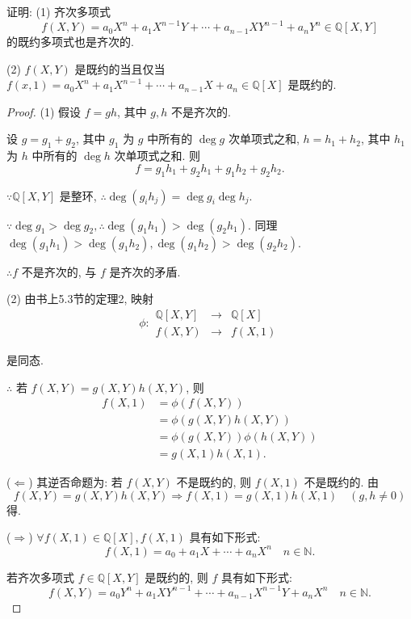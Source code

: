 \documentclass[UTF8]{ctexart}
\begin{document}
\begin{exercise}[3.5]
    证明: (1) 齐次多项式
    \[f(X,Y)=a_0X^n+a_1X^{n-1}Y+\cdots+a_{n-1}XY^{n-1}+a_nY^n\in\mathbb{Q}[X,Y]\]
    的既约多项式也是齐次的.
    
    (2) $f(X,Y)$ 是既约的当且仅当 $f(x,1)=a_0X^n+a_1X^{n-1}+\cdots+a_{n-1}X+a_n\in\mathbb{Q}[X]$ 是既约的.
\end{exercise}
\begin{proof}
    (1) 假设 $f=gh$, 其中 $g,h$ 不是齐次的.

    设 $g=g_1+g_2$, 其中 $g_1$ 为 $g$ 中所有的 $\deg g$ 次单项式之和, $h=h_1+h_2$, 其中 $h_1$ 为 $h$ 中所有的 $\deg h$ 次单项式之和. 则
    \[f=g_1h_1+g_2h_1+g_1h_2+g_2h_2.\]

    $\because\mathbb{Q}[X,Y]$ 是整环, $\therefore\deg(g_ih_j)=\deg g_i\deg h_j$.
    
    $\because\deg g_1>\deg g_2,\therefore\deg(g_1h_1)>\deg(g_2h_1)$. 同理 $\deg(g_1h_1)>\deg(g_1h_2),\deg(g_1h_2)>\deg(g_2h_2)$.

    $\therefore f$ 不是齐次的, 与 $f$ 是齐次的矛盾.

    (2) 由书上5.3节的定理2, 映射
    \[\phi:\begin{array}{rcl}
        \mathbb{Q}[X,Y] & \to & \mathbb{Q}[X] \\
        f(X,Y) & \to & f(X,1)
    \end{array}\]

    是同态.

    $\therefore$ 若 $f(X,Y)=g(X,Y)h(X,Y)$, 则
    \begin{align*}
        f(X,1) & =\phi(f(X,Y)) \\
        & =\phi(g(X,Y)h(X,Y)) \\
        & =\phi(g(X,Y))\phi(h(X,Y)) \\
        & =g(X,1)h(X,1).
    \end{align*}

    ($\Leftarrow$) 其逆否命题为: 若 $f(X,Y)$ 不是既约的, 则 $f(X,1)$ 不是既约的. 由
    \[f(X,Y)=g(X,Y)h(X,Y)\Rightarrow f(X,1)=g(X,1)h(X,1)\quad(g,h\neq0)\]
    得.
    
    ($\Rightarrow$) $\forall f(X,1)\in\mathbb{Q}[X],f(X,1)$ 具有如下形式:
    \begin{equation}\label{eq4.4}
        f(X,1)=a_0+a_1X+\cdots+a_nX^n\quad n\in\mathbb{N}.
    \end{equation}

    若齐次多项式 $f\in\mathbb{Q}[X,Y]$ 是既约的, 则 $f$ 具有如下形式:
    \begin{equation}\label{eq4.5}
        f(X,Y)=a_0Y^n+a_1XY^{n-1}+\cdots+a_{n-1}X^{n-1}Y+a_nX^n\quad n\in\mathbb{N}.
    \end{equation}


\end{proof}
\end{document}
